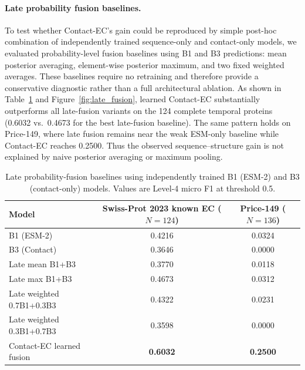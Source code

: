 \documentclass[11pt,a4paper]{article}
\begin{document}
\paragraph{Late probability fusion baselines.}
To test whether Contact-EC's gain could be reproduced by simple post-hoc
combination of independently trained sequence-only and contact-only models, we
evaluated probability-level fusion baselines using B1 and B3 predictions:
mean posterior averaging, element-wise posterior maximum, and two fixed
weighted averages. These baselines require no retraining and therefore provide a
conservative diagnostic rather than a full architectural ablation. As shown in
Table~\ref{tab:late_fusion} and Figure~\ref{fig:late_fusion}, learned Contact-EC
substantially outperforms all late-fusion variants on the 124 complete temporal
proteins (0.6032 vs.\ 0.4673 for the best late-fusion baseline). The same pattern
holds on Price-149, where late fusion remains near the weak ESM-only baseline
while Contact-EC reaches 0.2500. Thus the observed sequence--structure gain is
not explained by naive posterior averaging or maximum pooling.

\begin{table}[htbp]
\centering
\caption{Late probability-fusion baselines using independently trained B1
(ESM-2) and B3 (contact-only) models. Values are Level-4 micro F1 at threshold
0.5.}
\label{tab:late_fusion}
\small
\setlength{\tabcolsep}{5pt}
\begin{tabular}{lcc}
\toprule
Model & Swiss-Prot 2023 known EC ($N=124$) & Price-149 ($N=136$) \\
\midrule
B1 (ESM-2) & 0.4216 & 0.0324 \\
B3 (Contact) & 0.3646 & 0.0000 \\
Late mean B1+B3 & 0.3770 & 0.0118 \\
Late max B1+B3 & 0.4673 & 0.0312 \\
Late weighted 0.7B1+0.3B3 & 0.4322 & 0.0231 \\
Late weighted 0.3B1+0.7B3 & 0.3598 & 0.0000 \\
Contact-EC learned fusion & \textbf{0.6032} & \textbf{0.2500} \\
\bottomrule
\end{tabular}
\end{table}
\end{document}
